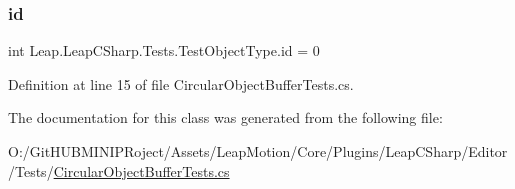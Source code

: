 \subsubsection{\texorpdfstring{id}{id}}
{\footnotesize\ttfamily int Leap.\+Leap\+C\+Sharp.\+Tests.\+Test\+Object\+Type.\+id = 0}



Definition at line 15 of file Circular\+Object\+Buffer\+Tests.\+cs.



The documentation for this class was generated from the following file\+:\begin{DoxyCompactItemize}
\item 
O\+:/\+Git\+H\+U\+B\+M\+I\+N\+I\+P\+Roject/\+Assets/\+Leap\+Motion/\+Core/\+Plugins/\+Leap\+C\+Sharp/\+Editor/\+Tests/\mbox{\hyperlink{_circular_object_buffer_tests_8cs}{Circular\+Object\+Buffer\+Tests.\+cs}}\end{DoxyCompactItemize}
